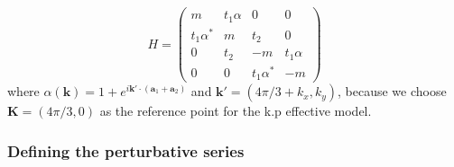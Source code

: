 $$
H =
\begin{pmatrix}
m & t_1 \alpha & 0 & 0\\
t_1 \alpha^{*} & m & t_2 & 0\\
0 & t_2 & -m & t_1 \alpha\\
0 & 0 & t_1 \alpha^{*} & -m
\end{pmatrix}
$$
%
%
where $\alpha(\mathbf{k}) = 1 + e^{i \mathbf{k'} \cdot (\mathbf{a}_1 +
\mathbf{a}_2)}$ and $\mathbf{k'} = (4\pi/3 + k_x, k_y)$, because we choose
$\mathbf{K}=(4\pi/3, 0)$ as the reference point for the k.p effective model.

\subsubsection{Defining the perturbative series}

